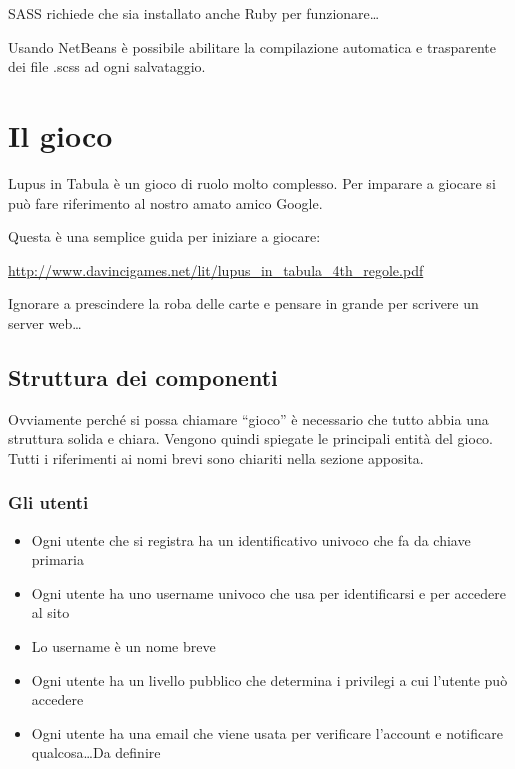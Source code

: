 \documentclass[10pt,a4paper]{article}
\begin{document}
SASS richiede che sia installato anche Ruby per funzionare\dots 

Usando NetBeans è possibile abilitare la compilazione automatica e trasparente dei file .scss ad ogni salvataggio.

\newpage

\section{Il gioco}
Lupus in Tabula è un gioco di ruolo molto complesso. Per imparare a giocare si può fare riferimento al nostro amato amico Google.

Questa è una semplice guida per iniziare a giocare:

\url{http://www.davincigames.net/lit/lupus_in_tabula_4th_regole.pdf}

Ignorare a prescindere la roba delle carte e pensare in grande per scrivere un server web\dots

\subsection{Struttura dei componenti}
Ovviamente perché si possa chiamare “gioco” è necessario che tutto abbia una struttura solida e chiara. Vengono quindi spiegate le principali entità del gioco. Tutti i riferimenti ai nomi brevi sono chiariti nella sezione apposita.

\subsubsection{Gli utenti}
\begin{itemize}
\item Ogni utente che si registra ha un identificativo univoco che fa da chiave primaria
\item Ogni utente ha uno \textsf{username} univoco che usa per identificarsi e per accedere al sito
\item Lo \textsf{username} è un nome breve
\item Ogni utente ha un livello pubblico che determina i privilegi a cui l'utente può accedere
\item Ogni utente ha una email che viene usata per verificare l'account e notificare qualcosa\dots Da definire
\end{itemize}
\end{document}
